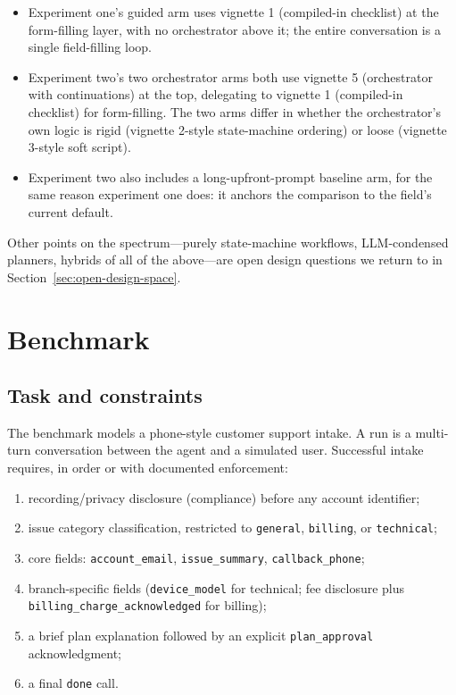 \documentclass[11pt,a4paper]{article}
\begin{document}
\begin{itemize}[noitemsep]
    \item Experiment one's guided arm uses vignette 1 (compiled-in checklist) at the form-filling layer, with no orchestrator above it; the entire conversation is a single field-filling loop.
    \item Experiment two's two orchestrator arms both use vignette 5 (orchestrator with continuations) at the top, delegating to vignette 1 (compiled-in checklist) for form-filling. The two arms differ in whether the orchestrator's own logic is rigid (vignette 2-style state-machine ordering) or loose (vignette 3-style soft script).
    \item Experiment two also includes a long-upfront-prompt baseline arm, for the same reason experiment one does: it anchors the comparison to the field's current default.
\end{itemize}

Other points on the spectrum---purely state-machine workflows, LLM-condensed planners, hybrids of all of the above---are open design questions we return to in Section~\ref{sec:open-design-space}.

\section{Benchmark}
\label{sec:benchmark}

\subsection{Task and constraints}

The benchmark models a phone-style customer support intake. A run is a multi-turn conversation between the agent and a simulated user. Successful intake requires, in order or with documented enforcement:

\begin{enumerate}[noitemsep,leftmargin=2em]
    \item recording/privacy disclosure (compliance) before any account identifier;
    \item issue category classification, restricted to \texttt{general}, \texttt{billing}, or \texttt{technical};
    \item core fields: \texttt{account\_email}, \texttt{issue\_summary}, \texttt{callback\_phone};
    \item branch-specific fields (\texttt{device\_model} for technical; fee disclosure plus \texttt{billing\_charge\_acknowledged} for billing);
    \item a brief plan explanation followed by an explicit \texttt{plan\_approval} acknowledgment;
    \item a final \texttt{done} call.
\end{enumerate}
\end{document}
